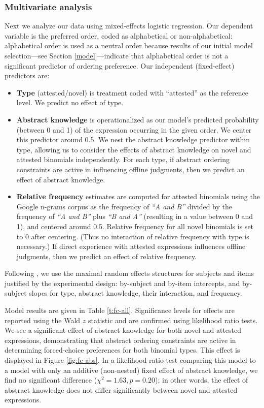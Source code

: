 \documentclass[authoryear]{elsarticle}
\begin{document}
\subsubsection{Multivariate analysis}\label{expt1-multivariate}
Next we analyze our data using mixed-effects logistic regression. Our dependent variable is the preferred order, coded as alphabetical or non-alphabetical: alphabetical order is used as a neutral order because results of our initial model selection---see Section \ref{model}---indicate that alphabetical order is not a significant predictor of ordering preference. Our independent (fixed-effect) predictors are:
\begin{itemize}
  \item \textbf{Type} (attested/novel) is treatment coded with ``attested'' as the reference level. We predict no effect of type.
  \item  \textbf{Abstract knowledge} is operationalized as our model's predicted probability (between 0 and 1) of the expression occurring in the given order. We center this predictor around 0.5. We nest the abstract knowledge predictor within type, allowing us to consider the effects of abstract knowledge on novel and attested binomials independently. For each type, if abstract ordering constraints are active in influencing offline judgments, then we predict an effect of abstract knowledge.
  \item \textbf{Relative frequency} estimates are computed for attested binomials using the Google n-grams corpus \citep{WebTgramVersio:tv} as the frequency of \emph{``A and B''} divided by the frequency of \emph{``A and B'' }plus \emph{``B and A''} (resulting in a value between 0 and 1), and centered around 0.5. Relative frequency for all novel binomials is set to 0 after centering. (Thus no interaction of relative frequency with type is necessary.) If direct experience with attested expressions influences offline judgments, then we predict an effect of relative frequency.
\end{itemize}
Following \citet{Barr:2013vf}, we use the maximal random effects structures for subjects and items justified by the experimental design: by-subject and by-item intercepts, and by-subject slopes for type, abstract knowledge, their interaction, and frequency.

Model results are given in Table \ref{t:fc-all}. Significance levels for effects are reported using the Wald $z$ statistic and are confirmed using likelihood ratio tests. We see a significant effect of abstract knowledge for both novel and attested expressions, demonstrating that abstract ordering constraints are active in determining forced-choice preferences for both binomial types. This effect is displayed in Figure \ref{fig:fc-abs}. In a likelihood ratio test comparing this model to a model with only an additive (non-nested) fixed effect of abstract knowledge, we find no significant difference ($\chi^{2}=1.63, p=0.20$); in other words, the effect of abstract knowledge does not differ significantly between novel and attested expressions.
\end{document}
